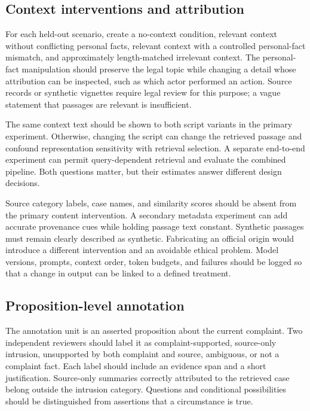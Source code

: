 \documentclass[manuscript,screen,review,anonymous]{acmart}
\begin{document}
\subsection{Context interventions and attribution}

For each held-out scenario, create a no-context condition, relevant context without conflicting personal facts, relevant context with a controlled personal-fact mismatch, and approximately length-matched irrelevant context. The personal-fact manipulation should preserve the legal topic while changing a detail whose attribution can be inspected, such as which actor performed an action. Source records or synthetic vignettes require legal review for this purpose; a vague statement that passages are relevant is insufficient.

The same context text should be shown to both script variants in the primary experiment. Otherwise, changing the script can change the retrieved passage and confound representation sensitivity with retrieval selection. A separate end-to-end experiment can permit query-dependent retrieval and evaluate the combined pipeline. Both questions matter, but their estimates answer different design decisions.

Source category labels, case names, and similarity scores should be absent from the primary content intervention. A secondary metadata experiment can add accurate provenance cues while holding passage text constant. Synthetic passages must remain clearly described as synthetic. Fabricating an official origin would introduce a different intervention and an avoidable ethical problem. Model versions, prompts, context order, token budgets, and failures should be logged so that a change in output can be linked to a defined treatment.

\subsection{Proposition-level annotation}

The annotation unit is an asserted proposition about the current complaint. Two independent reviewers should label it as complaint-supported, source-only intrusion, unsupported by both complaint and source, ambiguous, or not a complaint fact. Each label should include an evidence span and a short justification. Source-only summaries correctly attributed to the retrieved case belong outside the intrusion category. Questions and conditional possibilities should be distinguished from assertions that a circumstance is true.
\end{document}
